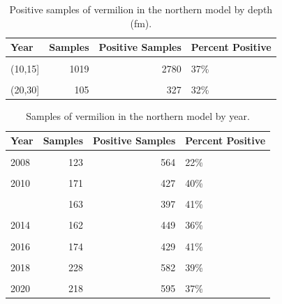 \documentclass[11pt,
  english,
  a4paper,
]{article}
\begin{document}
\begin{table}

\caption{\label{tab:tab-depth-ccfrp}Positive samples of vermilion in the northern model by depth (fm).}
\centering
\begin{tabular}[t]{lrrl}
\toprule
Year & Samples & Positive Samples & Percent Positive\\
\midrule
\cellcolor{gray!6}{(0,10]} & \cellcolor{gray!6}{385} & \cellcolor{gray!6}{1712} & \cellcolor{gray!6}{22\%}\\
(10,15] & 1019 & 2780 & 37\%\\
\cellcolor{gray!6}{(15,20]} & \cellcolor{gray!6}{741} & \cellcolor{gray!6}{1713} & \cellcolor{gray!6}{43\%}\\
(20,30] & 105 & 327 & 32\%\\
\bottomrule
\end{tabular}
\end{table}

\begin{table}

\caption{\label{tab:tab-year-ccfrp}Samples of vermilion in the northern model by year.}
\centering
\begin{tabular}[t]{lrrl}
\toprule
Year & Samples & Positive Samples & Percent Positive\\
\midrule
\cellcolor{gray!6}{2007} & \cellcolor{gray!6}{96} & \cellcolor{gray!6}{552} & \cellcolor{gray!6}{17\%}\\
2008 & 123 & 564 & 22\%\\
\cellcolor{gray!6}{2009} & \cellcolor{gray!6}{115} & \cellcolor{gray!6}{371} & \cellcolor{gray!6}{31\%}\\
2010 & 171 & 427 & 40\%\\
\cellcolor{gray!6}{2011} & \cellcolor{gray!6}{142} & \cellcolor{gray!6}{374} & \cellcolor{gray!6}{38\%}\\
\addlinespace
2012 & 163 & 397 & 41\%\\
\cellcolor{gray!6}{2013} & \cellcolor{gray!6}{110} & \cellcolor{gray!6}{430} & \cellcolor{gray!6}{26\%}\\
2014 & 162 & 449 & 36\%\\
\cellcolor{gray!6}{2015} & \cellcolor{gray!6}{98} & \cellcolor{gray!6}{224} & \cellcolor{gray!6}{44\%}\\
2016 & 174 & 429 & 41\%\\
\addlinespace
\cellcolor{gray!6}{2017} & \cellcolor{gray!6}{190} & \cellcolor{gray!6}{516} & \cellcolor{gray!6}{37\%}\\
2018 & 228 & 582 & 39\%\\
\cellcolor{gray!6}{2019} & \cellcolor{gray!6}{260} & \cellcolor{gray!6}{622} & \cellcolor{gray!6}{42\%}\\
2020 & 218 & 595 & 37\%\\
\bottomrule
\end{tabular}
\end{table}
\end{document}
